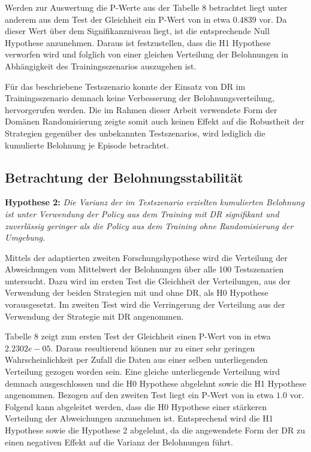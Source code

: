 Werden zur Auswertung die P-Werte aus der Tabelle 8 betrachtet liegt unter anderem aus dem Test der Gleichheit ein P-Wert von in etwa $0.4839$ vor.
Da dieser Wert über dem Signifikanzniveau liegt, ist die entsprechende Null Hypothese anzunehmen.
Daraus ist festzustellen, dass die H1 Hypothese verworfen wird und folglich von einer gleichen Verteilung der Belohnungen in Abhängigkeit des Trainingsszenarios auszugehen ist.

Für das beschriebene Testszenario konnte der Einsatz von DR im Trainingsszenario demnach keine Verbesserung der Belohnungsverteilung, hervorgerufen werden.
Die im Rahmen dieser Arbeit verwendete Form der Domänen Randomisierung zeigte somit auch keinen Effekt auf die Robustheit der Strategien gegenüber des unbekannten Testszenarios, wird lediglich die kumulierte Belohnung je Episode betrachtet.

\subsection{Betrachtung der Belohnungsstabilität}

\textbf{Hypothese 2:}
\textit{Die Varianz der im Testszenario erzielten kumulierten Belohnung ist unter Verwendung der Policy aus dem Training mit DR signifikant und zuverlässig geringer als die Policy aus dem Training ohne Randomisierung der Umgebung.}

Mittels der adaptierten zweiten Forschungshypothese wird die Verteilung der Abweichungen vom Mittelwert der Belohnungen über alle 100 Testszenarien untersucht.
Dazu wird im ersten Test die Gleichheit der Verteilungen, aus der Verwendung der beiden Strategien mit und ohne DR, als H0 Hypothese vorausgesetzt.
Im zweiten Test wird die Verringerung der Verteilung aus der Verwendung der Strategie mit DR angenommen.

Tabelle 8 zeigt zum ersten Test der Gleichheit einen P-Wert von in etwa $2.2302e-05$.
Daraus resultierend können nur zu einer sehr geringen Wahrscheinlichkeit per Zufall die Daten aus einer selben unterliegenden Verteilung gezogen worden sein.
Eine gleiche unterliegende Verteilung wird demnach ausgeschlossen und die H0 Hypothese abgelehnt sowie die H1 Hypothese angenommen.
Bezogen auf den zweiten Test liegt ein P-Wert von in etwa $1.0$ vor.
Folgend kann abgeleitet werden, dass die H0 Hypothese einer stärkeren Verteilung der Abweichungen anzunehmen ist.
Entsprechend wird die H1 Hypothese sowie die Hypothese 2 abgelehnt, da die angewendete Form der DR zu einen negativen Effekt auf die Varianz der Belohnungen führt.

